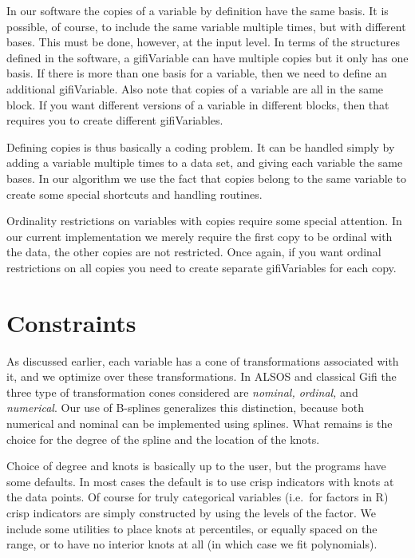 \documentclass[
  12pt,
  letterpaper,
  DIV=11,
  numbers=noendperiod]{scrreprt}
\begin{document}
In our software the copies of a variable by definition have the same
basis. It is possible, of course, to include the same variable multiple
times, but with different bases. This must be done, however, at the
input level. In terms of the structures defined in the software, a
gifiVariable can have multiple copies but it only has one basis. If
there is more than one basis for a variable, then we need to define an
additional gifiVariable. Also note that copies of a variable are all in
the same block. If you want different versions of a variable in
different blocks, then that requires you to create different
gifiVariables.

Defining copies is thus basically a coding problem. It can be handled
simply by adding a variable multiple times to a data set, and giving
each variable the same bases. In our algorithm we use the fact that
copies belong to the same variable to create some special shortcuts and
handling routines.

Ordinality restrictions on variables with copies require some special
attention. In our current implementation we merely require the first
copy to be ordinal with the data, the other copies are not restricted.
Once again, if you want ordinal restrictions on all copies you need to
create separate gifiVariables for each copy.

\section{Constraints}\label{constraints}

As discussed earlier, each variable has a cone of transformations
associated with it, and we optimize over these transformations. In ALSOS
and classical Gifi the three type of transformation cones considered are
\emph{nominal, ordinal,} and \emph{numerical}. Our use of B-splines
generalizes this distinction, because both numerical and nominal can be
implemented using splines. What remains is the choice for the degree of
the spline and the location of the knots.

Choice of degree and knots is basically up to the user, but the programs
have some defaults. In most cases the default is to use crisp indicators
with knots at the data points. Of course for truly categorical variables
(i.e.~for factors in R) crisp indicators are simply constructed by using
the levels of the factor. We include some utilities to place knots at
percentiles, or equally spaced on the range, or to have no interior
knots at all (in which case we fit polynomials).
\end{document}
